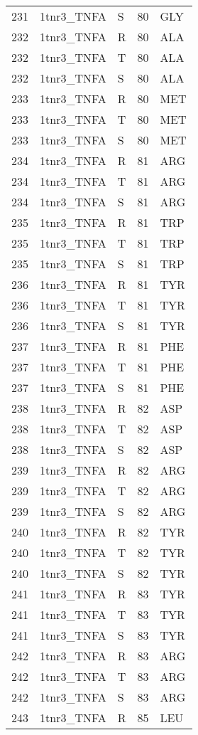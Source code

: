 \begin{longtable}[l]{l|l|l|l|l}
	231 & 1tnr3_TNFA & S & 80 & GLY \\
	232 & 1tnr3_TNFA & R & 80 & ALA \\
	232 & 1tnr3_TNFA & T & 80 & ALA \\
	232 & 1tnr3_TNFA & S & 80 & ALA \\
	233 & 1tnr3_TNFA & R & 80 & MET \\
	233 & 1tnr3_TNFA & T & 80 & MET \\
	233 & 1tnr3_TNFA & S & 80 & MET \\
	234 & 1tnr3_TNFA & R & 81 & ARG \\
	234 & 1tnr3_TNFA & T & 81 & ARG \\
	234 & 1tnr3_TNFA & S & 81 & ARG \\
	235 & 1tnr3_TNFA & R & 81 & TRP \\
	235 & 1tnr3_TNFA & T & 81 & TRP \\
	235 & 1tnr3_TNFA & S & 81 & TRP \\
	236 & 1tnr3_TNFA & R & 81 & TYR \\
	236 & 1tnr3_TNFA & T & 81 & TYR \\
	236 & 1tnr3_TNFA & S & 81 & TYR \\
	237 & 1tnr3_TNFA & R & 81 & PHE \\
	237 & 1tnr3_TNFA & T & 81 & PHE \\
	237 & 1tnr3_TNFA & S & 81 & PHE \\
	238 & 1tnr3_TNFA & R & 82 & ASP \\
	238 & 1tnr3_TNFA & T & 82 & ASP \\
	238 & 1tnr3_TNFA & S & 82 & ASP \\
	239 & 1tnr3_TNFA & R & 82 & ARG \\
	239 & 1tnr3_TNFA & T & 82 & ARG \\
	239 & 1tnr3_TNFA & S & 82 & ARG \\
	240 & 1tnr3_TNFA & R & 82 & TYR \\
	240 & 1tnr3_TNFA & T & 82 & TYR \\
	240 & 1tnr3_TNFA & S & 82 & TYR \\
	241 & 1tnr3_TNFA & R & 83 & TYR \\
	241 & 1tnr3_TNFA & T & 83 & TYR \\
	241 & 1tnr3_TNFA & S & 83 & TYR \\
	242 & 1tnr3_TNFA & R & 83 & ARG \\
	242 & 1tnr3_TNFA & T & 83 & ARG \\
	242 & 1tnr3_TNFA & S & 83 & ARG \\
	243 & 1tnr3_TNFA & R & 85 & LEU \\

\end{longtable}
